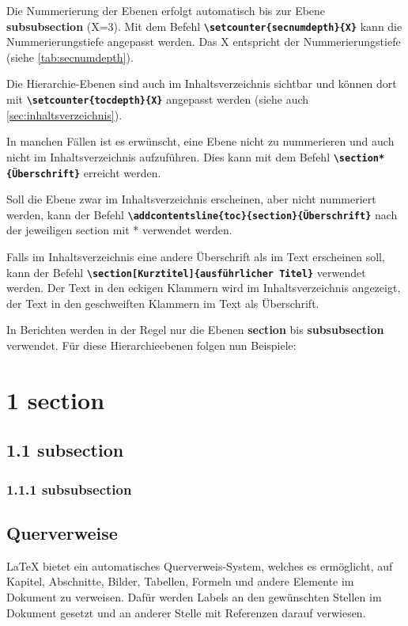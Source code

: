 
Die Nummerierung der Ebenen erfolgt automatisch bis zur Ebene \textbf{subsubsection} (X=3).
Mit dem Befehl \textbf{\texttt{\textbackslash setcounter\{secnumdepth\}\{X\}}} kann die Nummerierungstiefe angepasst werden. Das X entspricht der Nummerierungstiefe (siehe \autoref{tab:secnumdepth}).


Die Hierarchie-Ebenen sind auch im Inhaltsverzeichnis sichtbar und können dort mit \textbf{\texttt{\textbackslash setcounter\{tocdepth\}\{X\}}} angepasst werden (siehe auch \ref{sec:inhaltsverzeichnis}).

In manchen Fällen ist es erwünscht, eine Ebene nicht zu nummerieren und auch nicht im Inhaltsverzeichnis aufzuführen. Dies kann mit dem Befehl \textbf{\texttt{\textbackslash section*\{Überschrift\}}} erreicht werden.

Soll die Ebene zwar im Inhaltsverzeichnis erscheinen, aber nicht nummeriert werden, kann der Befehl \textbf{\texttt{\textbackslash addcontentsline\{toc\}\{section\}\{Überschrift\}}} nach der jeweiligen section mit * verwendet werden.

Falls im Inhaltsverzeichnis eine andere Überschrift als im Text erscheinen soll, kann der Befehl \textbf{\texttt{\textbackslash section[Kurztitel]\{ausführlicher Titel\}}} verwendet werden. Der Text in den eckigen Klammern wird im Inhaltsverzeichnis angezeigt, der Text in den geschweiften Klammern im Text als Überschrift.

In Berichten werden in der Regel nur die Ebenen \textbf{section} bis \textbf{subsubsection} verwendet. Für diese Hierarchieebenen folgen nun Beispiele:
\section*{1 \hspace{0.15cm} section}

\subsection*{1.1 \hspace{0.15cm} subsection}

\subsubsection*{1.1.1 \hspace{0.15cm} subsubsection}

\newpage

\subsection{Querverweise}
\label{sec:querverweise}
\LaTeX{} bietet ein automatisches Querverweis-System, welches es ermöglicht, auf Kapitel, Abschnitte, Bilder, Tabellen, Formeln und andere Elemente im Dokument zu verweisen.
Dafür werden Labels an den gewünschten Stellen im Dokument gesetzt und an anderer Stelle mit Referenzen darauf verwiesen.

